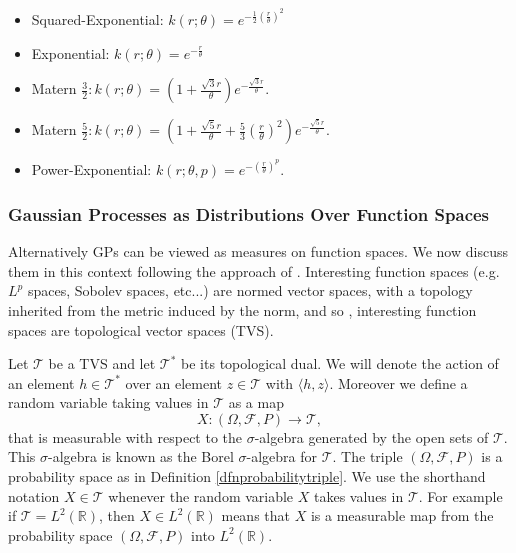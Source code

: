 \documentclass[12pt]{book}
\newcommand{\tvs}{\mathscr{T}} %
\begin{document}
\begin{itemize}
\item Squared-Exponential: $k(r;\theta)=e^{-\frac{1}{2}(\frac{r}{\theta})^{2}}$
\item Exponential: $k(r;\theta)=e^{-\frac{r}{\theta}}$\\
\item Matern $\frac{3}{2}: k(r;\theta)=(1+\frac{\sqrt{3}r}{\theta})e^{-\frac{\sqrt{3}r}{\theta}}$.
\item Matern $\frac{5}{2}: k(r;\theta)=(1+\frac{\sqrt{5}r}{\theta}+\frac{5}{3}
(\frac{r}{\theta})^{2})e^{-\frac{\sqrt{5}r}{\theta}}$.
\item Power-Exponential: $k(r;\theta,p)=e^{-(\frac{r}{\theta})^{p}}$.
\end{itemize}





\subsubsection{Gaussian Processes as Distributions Over Function Spaces}

Alternatively GPs can be viewed as  measures on function spaces. We now discuss them in this
context following the approach of \cite{lifshits2012lectures}.
\newline
Interesting function spaces (e.g. $L^{p}$ spaces, Sobolev spaces, etc...) are 
normed vector spaces, with a topology inherited from the metric induced by the norm, and so 
, interesting function spaces are topological vector spaces (TVS). 

Let $\mathscr{T}$ be a TVS and  let $\mathscr{T}^{*}$ be its topological dual. 
We will denote the action of an 
element $h\in\tvs^{*}$ over an element $z\in\tvs$ with $\langle h,z\rangle$. Moreover 
we  define a random variable taking values in $\tvs$ as a map 
\begin{equation*}
X:(\Omega,\mathscr{F},P)\longrightarrow\tvs,
\end{equation*}
that is measurable with respect to the $\sigma$-algebra generated by the open sets
of $\tvs$. This $\sigma$-algebra is known as the Borel $\sigma$-algebra for $\tvs$.
The triple $(\Omega,\mathscr{F},P)$ is a probability space as in Definition \ref{dfnprobabilitytriple}. 
We use the shorthand notation  $X\in\tvs$ whenever the random variable $X$ takes values in $\tvs$. 
For example if $\tvs=L^{2}(\mathbb{R})$,  then  $X\in L^{2}(\mathbb{R})$ means that $X$ is a measurable
map from the probability space $(\Omega,\mathscr{F},P)$ into $L^{2}(\mathbb{R})$.
\end{document}
